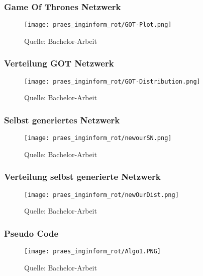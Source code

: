 \documentclass[notes=show]{beamer}
\begin{document}
\begin{frame}
  \frametitle{Game Of Thrones Netzwerk}
\vspace{-2.6cm}
\vspace{2.5cm}
  \begin{figure}
  \hspace{4cm}
  \texttt{[image: praes\_inginform\_rot/GOT-Plot.png]}
  \caption{Quelle: Bachelor-Arbeit}
  \label{fig:distributionALL}
\end{figure}
\end{frame}

\begin{frame}
  \frametitle{Verteilung GOT Netzwerk}
\vspace{-2.6cm}
\vspace{2.5cm}
  \begin{figure}
  \hspace{4cm}
  \texttt{[image: praes\_inginform\_rot/GOT-Distribution.png]}
  \caption{Quelle: Bachelor-Arbeit}
  \label{fig:distributionALL}
\end{figure}
\end{frame}

\begin{frame}
  \frametitle{Selbst generiertes Netzwerk}
\vspace{-2.6cm}
\vspace{2.5cm}
  \begin{figure}
  \hspace{4cm}
  \texttt{[image: praes\_inginform\_rot/newourSN.png]}
  \caption{Quelle: Bachelor-Arbeit}
  \label{fig:distributionALL}
\end{figure}
\end{frame}

\begin{frame}
  \frametitle{Verteilung selbst generierte Netzwerk}
\vspace{-2.6cm}
\vspace{2.5cm}
  \begin{figure}
  \hspace{4cm}
  \texttt{[image: praes\_inginform\_rot/newOurDist.png]}
  \caption{Quelle: Bachelor-Arbeit}
  \label{fig:distributionALL}
\end{figure}
\end{frame}

\begin{frame}
  \frametitle{Pseudo Code}
\vspace{-2.6cm}
\vspace{2.5cm}
  \begin{figure}
  \hspace{4cm}
  \texttt{[image: praes\_inginform\_rot/Algo1.PNG]}
  \caption{Quelle: Bachelor-Arbeit}
  \label{fig:distributionALL}
\end{figure}
\end{frame}
\end{document}
